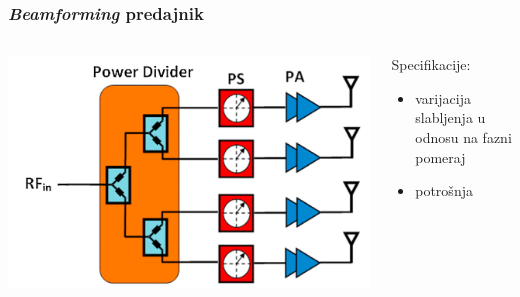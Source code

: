 \documentclass{beamer}
\begin{document}
\begin{frame}
\frametitle{\textit{Beamforming} predajnik}
\begin{columns}
  \begin{column}{0.5\textwidth}
    \includegraphics[width=\linewidth]{beam_forming_transmitter.png}
  \end{column}
  \begin{column}{0.5\textwidth}
    Specifikacije:
    \begin{itemize}
      \item varijacija slabljenja u odnosu na fazni pomeraj
      \item potrošnja 
    \end{itemize}
  \end{column}
\end{columns}
\end{frame}

\end{document}
